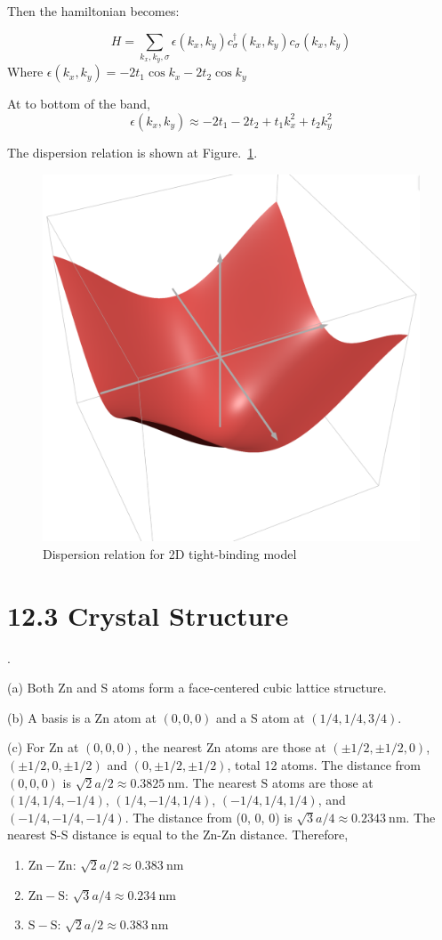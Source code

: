 \documentclass[a4paper,11pt]{article}
\begin{document}
Then the hamiltonian becomes:

\begin{equation}
    H=\sum_{k_x, k_y,\sigma}\epsilon(k_x, k_y)c_\sigma^\dagger (k_x, k_y) c_\sigma (k_x, k_y)
\end{equation}
Where $\epsilon(k_x, k_y)=-2t_1\cos k_x -2t_2 \cos k_y$

At to bottom of the band,
\begin{equation}
    \epsilon(k_x, k_y)\approx-2t_1-2t_2 + t_1k_x^2 + t_2k_y^2
\end{equation}

The dispersion relation is shown at Figure.~\ref{fig:2d-dis}.

\begin{figure}[b!]
    \centering
    \includegraphics[width=0.5\linewidth]{2D tight-binding dispersion.png}
    \caption{Dispersion relation for 2D tight-binding model}
    \label{fig:2d-dis}
\end{figure}




\section{12.3 Crystal Structure}

.

(a) Both Zn and S atoms form a face-centered cubic lattice structure.


(b) A basis is a $\mathrm{Zn}$ atom at $(0, 0, 0)$ and a $\mathrm{S}$ atom at $(1/4, 1/4, 3/4)$.


(c) For $\mathrm{Zn}$ at $(0, 0, 0)$, the nearest $\mathrm{Zn}$ atoms are those at $(\pm1/2, \pm1/2, 0)$, $(\pm1/2, 0, \pm1/2)$ and $(0, \pm1/2, \pm1/2)$, total 12 atoms. The distance from $(0, 0, 0)$ is $\sqrt{2}a/2\approx0.3825\ \mathrm{nm}$. The nearest $\mathrm{S}$ atoms are those at $(1/4, 1/4, -1/4)$, $(1/4, -1/4, 1/4)$, $(-1/4, 1/4,1/4)$, and $(-1/4, -1/4, -1/4)$. The distance from (0, 0, 0) is $\sqrt3 a/4\approx 0.2343\ \mathrm{nm}$. The nearest S-S distance is equal to the Zn-Zn distance. Therefore,

\begin{enumerate}
    \item $\mathrm{Zn}-\mathrm{Zn}$: $\sqrt{2}a/2\approx0.383\ \mathrm{nm}$
    \item $\mathrm{Zn}-\mathrm{S}$: $\sqrt3 a/4\approx 0.234\ \mathrm{nm}$
    \item $\mathrm{S}-\mathrm{S}$: $\sqrt{2}a/2\approx0.383\ \mathrm{nm}$
\end{enumerate}
\end{document}
